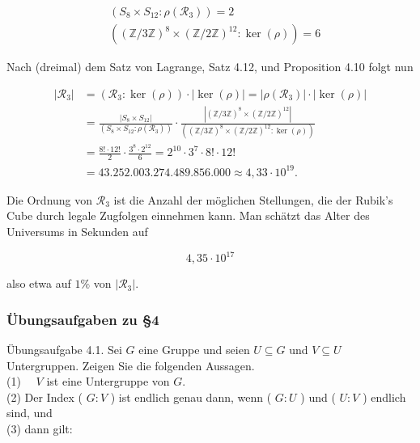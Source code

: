 \documentclass[10pt, letterpaper]{article}
\begin{document}
$$
\begin{aligned}
& \left(S_{8} \times S_{12}: \rho\left(\mathscr{R}_{3}\right)\right)=2 \\
& \left((\mathbb{Z} / 3 \mathbb{Z})^{8} \times(\mathbb{Z} / 2 \mathbb{Z})^{12}: \operatorname{ker}(\rho)\right)=6
\end{aligned}
$$

Nach (dreimal) dem Satz von Lagrange, Satz 4.12, und Proposition 4.10 folgt nun

$$
\begin{aligned}
\left|\mathscr{R}_{3}\right| & =\left(\mathscr{R}_{3}: \operatorname{ker}(\rho)\right) \cdot|\operatorname{ker}(\rho)|=\left|\rho\left(\mathscr{R}_{3}\right)\right| \cdot|\operatorname{ker}(\rho)| \\
& =\frac{\left|S_{8} \times S_{12}\right|}{\left(S_{8} \times S_{12}: \rho\left(\mathscr{R}_{3}\right)\right)} \cdot \frac{\left|(\mathbb{Z} / 3 \mathbb{Z})^{8} \times(\mathbb{Z} / 2 \mathbb{Z})^{12}\right|}{\left((\mathbb{Z} / 3 \mathbb{Z})^{8} \times(\mathbb{Z} / 2 \mathbb{Z})^{12}: \operatorname{ker}(\rho)\right)} \\
& =\frac{8!\cdot 12!}{2} \cdot \frac{3^{8} \cdot 2^{12}}{6}=2^{10} \cdot 3^{7} \cdot 8!\cdot 12! \\
& =43.252 .003 .274 .489 .856 .000 \approx 4,33 \cdot 10^{19} .
\end{aligned}
$$

Die Ordnung von $\mathscr{R}_{3}$ ist die Anzahl der möglichen Stellungen, die der Rubik's Cube durch legale Zugfolgen einnehmen kann. Man schätzt das Alter des Universums in Sekunden auf

$$
4,35 \cdot 10^{17}
$$

also etwa auf $1 \%$ von $\left|\mathscr{R}_{3}\right|$.







\subsubsection{Übungsaufgaben zu §4}
Übungsaufgabe 4.1. Sei $G$ eine Gruppe und seien $U \subseteq G$ und $V \subseteq U$ Untergruppen. Zeigen Sie die folgenden Aussagen.\\
(1) $\quad V$ ist eine Untergruppe von $G$.\\
(2) Der Index ( $G: V$ ) ist endlich genau dann, wenn ( $G: U$ ) und ( $U: V$ ) endlich sind, und\\
(3) dann gilt:
\end{document}
